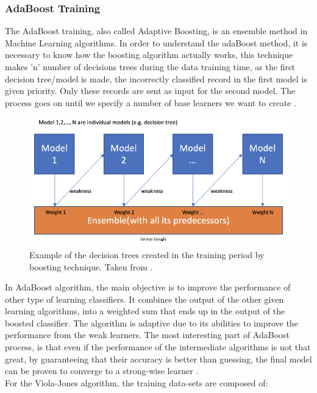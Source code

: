 \documentclass[11pt]{report} %
\begin{document}
\subsubsection{AdaBoost Training}

The AdaBoost training, also called Adaptive Boosting, is an ensemble method in Machine Learning algorithms. In order to understand the adaBoost method, it is necessary to know how the boosting algorithm actually works, this technique makes 'n' number of decisions trees during the data training time, as the first decision tree/model is made, the incorrectly classified record in the first model is given priority. Only these records are sent as input for the second model. The process goes on until we specify a number of base learners we want to create \citep{cite_adaboost_explained}.

\begin{figure}[H]
    \centering
    \includegraphics[width=0.8\linewidth]{assets/imgs/computer_vision/decition_trees.png}
    \caption{Example of the decision trees created in the training period by boosting technique. Taken from \citep{cite_adaboost_explained}.} 
    \label{fig_adaboost_explained}
\end{figure}

In AdaBoost algorithm, the main objective is to improve the performance of other type of learning classifiers. It combines the output of the other given learning algorithms, into a weighted sum that ends up in the output of the boosted classifier. The algorithm is adaptive due to its abilities to improve the performance from the weak learners. The most interesting part of AdaBoost process, is that even if the performance of the intermediate algorithms is not that great, by guaranteeing that their accuracy is better than guessing, the final model can be proven to converge to a strong-wise learner \citep{cite_adaboost_patrick_winston}.\\

For the Viola-Jones algorithm, the training data-sets are composed of:
\end{document}
